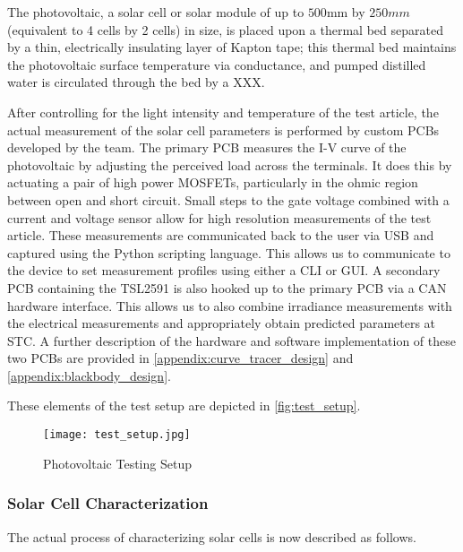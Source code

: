 The photovoltaic, a solar cell or solar module of up to $500 \si{\mm}$ by $250
\si{mm}$ (equivalent to 4 cells by 2 cells) in size, is placed upon a thermal
bed separated by a thin, electrically insulating layer of Kapton tape; this
thermal bed maintains the photovoltaic surface temperature via conductance, and
pumped distilled water is circulated through the bed by a  XXX.

After controlling for the light intensity and temperature of the test article,
the actual measurement of the solar cell parameters is performed by custom
\acp{PCB} developed by the team. The primary \ac{PCB} measures the \ac{I-V}
curve of the photovoltaic by adjusting the perceived load across the terminals.
It does this by actuating a pair of high power \acfp{MOSFET}, particularly in
the ohmic region between open and short circuit. Small steps to the gate voltage
combined with a current and voltage sensor allow for high resolution
measurements of the test article. These measurements are communicated back to
the user via \ac{USB} and captured using the Python scripting language. This
allows us to communicate to the device to set measurement profiles using either
a \ac{CLI} or \ac{GUI}. A secondary \ac{PCB} containing the TSL2591 is also
hooked up to the primary \ac{PCB} via a \ac{CAN} hardware interface. This
allows us to also combine irradiance measurements with the electrical
measurements and appropriately obtain predicted parameters at \ac{STC}. A
further description of the hardware and software implementation of these two
\acp{PCB} are provided in \autoref{appendix:curve_tracer_design} and
\autoref{appendix:blackbody_design}.

These elements of the test setup are depicted in \autoref{fig:test_setup}.

\begin{figure}[!htbp]
    \centering
    \texttt{[image: test\_setup.jpg]}
    \caption{Photovoltaic Testing Setup}
    \label{fig:test_setup}
\end{figure}
\newpage


\subsubsection{Solar Cell Characterization}\label{subsubsec:solar_cell_characterization}

The actual process of characterizing solar cells is now described as follows.

